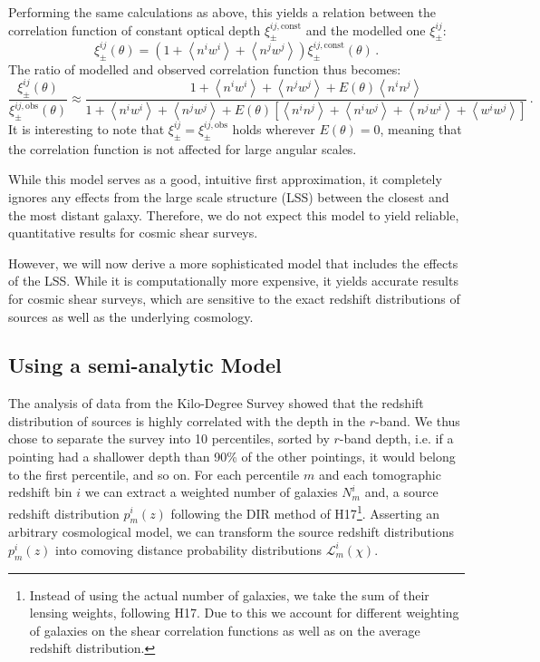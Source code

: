 \documentclass[referee]{aa} %
\renewcommand{\[}{\begin{equation}}
\renewcommand{\]}{\end{equation}}
\renewcommand{\rm}{\mathrm}
\def\la{\left<}
\def\ra{\right>}
\begin{document}
 Performing the same calculations as above, this yields a relation between the correlation function of constant optical depth $\xi_\pm^{ij,\rm{const}}$ and the modelled one $\xi_\pm^{ij}$:
\begin{equation}
\xi_\pm^{ij}(\theta) = \left(1+\la n^iw^i\ra + \la n^jw^j\ra \right)\xi_\pm^{ij,\rm{const}}(\theta)\, .
\end{equation}
The ratio of modelled and observed correlation function thus becomes: \begin{equation}
\frac{\xi^{ij}_\pm(\theta)}{\xi_\pm^{ij,\rm{obs}}(\theta)} \approx \frac{1+\la n^iw^i\ra+\la n^jw^j\ra + E(\theta)\la n^in^j\ra}{1 + \la n^iw^i\ra + \la n^jw^j\ra + E(\theta)\left[\la n^in^j\ra + \la n^iw^j\ra + \la n^j w^i\ra + \la w^iw^j\ra\right]}
\, .
\end{equation}
It is interesting to note that $\xi^{ij}_\pm = \xi_\pm^{ij,\rm{obs}}$ holds wherever $E(\theta)=0$, meaning that the correlation function is not affected for large angular scales. 

While this model serves as a good, intuitive first approximation, it completely ignores any effects from the large scale structure (LSS) between the closest and the most distant galaxy. Therefore, we do not expect this model to yield reliable, quantitative results for cosmic shear surveys.

However, we will now derive a more sophisticated model that includes the effects of the LSS. While it is computationally more expensive, it yields accurate results for cosmic shear surveys, which are sensitive to the exact redshift distributions of sources as well as the underlying cosmology.

\subsection{Using a semi-analytic Model}
\label{sec:xipm_semianalytic}
The analysis of data from the Kilo-Degree Survey showed that the redshift distribution of sources is highly correlated with the depth in the $r$-band. We thus chose to separate the survey into 10 percentiles, sorted by $r$-band depth, i.e. if a pointing had a shallower depth than 90\% of the other pointings, it would belong to the first percentile, and so on. For each percentile $m$ and each tomographic redshift bin $i$ we can extract a weighted number of galaxies $N^i_m$ and, a source redshift distribution $p^i_m(z)$ following the DIR method of H17\footnote{Instead of using the actual number of galaxies, we take the sum of their lensing weights, following H17. Due to this we account for different weighting of galaxies on the shear correlation functions as well as on the average redshift distribution.}. Asserting an arbitrary cosmological model, we can transform the source redshift distributions $p^i_m(z)$ into comoving distance probability distributions $\mathcal{L}^i_m(\chi)$.
\end{document}
